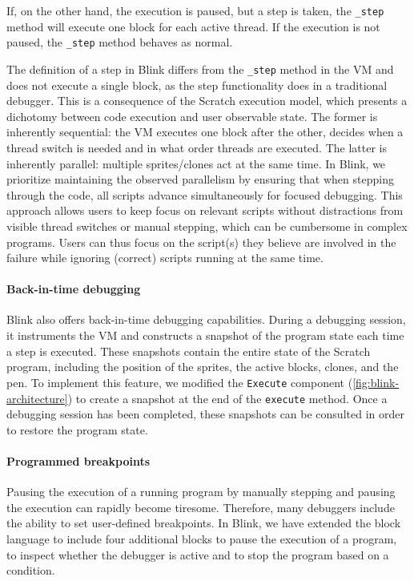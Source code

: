 \documentclass[../main]{subfiles}
\begin{document}
If, on the other hand, the execution is paused, but a step is taken, the \texttt{\_step} method will execute one block for each active thread.
If the execution is not paused, the \texttt{\_step} method behaves as normal.

The definition of a step in Blink differs from the \texttt{\_step} method in the VM and does not execute a single block, as the step functionality does in a traditional debugger.
This is a consequence of the Scratch execution model, which presents a dichotomy between code execution and user observable state.
The former is inherently sequential: the VM executes one block after the other, decides when a thread switch is needed and in what order threads are executed.
The latter is inherently parallel: multiple sprites/clones act at the same time.
In Blink, we prioritize maintaining the observed parallelism by ensuring that when stepping through the code, all scripts advance simultaneously for focused debugging.
This approach allows users to keep focus on relevant scripts without distractions from visible thread switches or manual stepping, which can be cumbersome in complex programs.
Users can thus focus on the script(s) they believe are involved in the failure while ignoring (correct) scripts running at the same time.

\paragraph{Back-in-time debugging}
Blink also offers back-in-time debugging capabilities.
During a debugging session, it instruments the VM and constructs a snapshot of the program state each time a step is executed.
These snapshots contain the entire state of the Scratch program, including the position of the sprites, the active blocks, clones, and the pen.
To implement this feature, we modified the \texttt{Execute} component (\cref{fig:blink-architecture}) to create a snapshot at the end of the \texttt{execute} method.
Once a debugging session has been completed, these snapshots can be consulted in order to restore the program state.

\paragraph{Programmed breakpoints}
Pausing the execution of a running program by manually stepping and pausing the execution can rapidly become tiresome.
Therefore, many debuggers include the ability to set user-defined breakpoints.
In Blink, we have extended the block language to include four additional blocks to pause the execution of a program, to inspect whether the debugger is active and to stop the program based on a condition.
\end{document}
